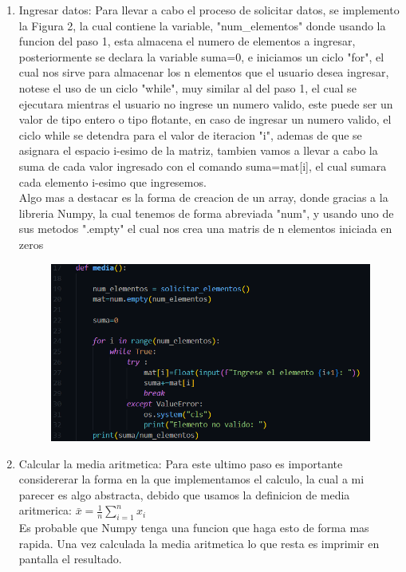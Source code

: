 \documentclass[12pt]{article}
\begin{document}
\begin{itemize}
\begin{enumerate}
\item Ingresar datos: Para llevar a cabo el proceso de solicitar datos, se implemento la Figura 2, la cual contiene la variable, "num\_elementos" donde usando la funcion del paso 1, esta almacena el numero de elementos a ingresar, posteriormente se declara la variable suma=0, e iniciamos un ciclo "for", el cual nos sirve para almacenar los n elementos que el usuario desea ingresar, notese el uso de un ciclo "while", muy similar al del paso 1, el cual se ejecutara mientras el usuario no ingrese un numero valido, este puede ser un valor de tipo entero o tipo flotante, en caso de ingresar un numero valido, el ciclo while se detendra para el valor de iteracion "i", ademas de que se asignara el espacio i-esimo de la matriz, tambien vamos a llevar a cabo la suma de cada valor ingresado con el comando suma=mat[i], el cual sumara cada elemento i-esimo que ingresemos.\\
Algo mas a destacar es la forma de creacion de un array, donde gracias a la libreria Numpy, la cual tenemos de forma abreviada "num", y usando uno de sus metodos ".empty" el cual nos crea una matris de n elementos iniciada en zeros

\begin{figure}[H]
	\begin{center}
	\includegraphics[width=.8\textwidth]{media.png}
	\end{center}
\end{figure}


\item Calcular la media aritmetica: Para este ultimo paso es importante considererar la forma en la que implementamos el calculo, la cual a mi parecer es algo abstracta, debido que usamos la definicion de media aritmerica:  $ \bar{x} = \frac{1}{n} \sum_{i=1}^{n} x_i$\\
Es probable que Numpy tenga una funcion que haga esto de forma mas rapida. Una vez calculada la media aritmetica lo que resta es imprimir en pantalla el resultado.



\end{enumerate}
\end{itemize}
\end{document}
